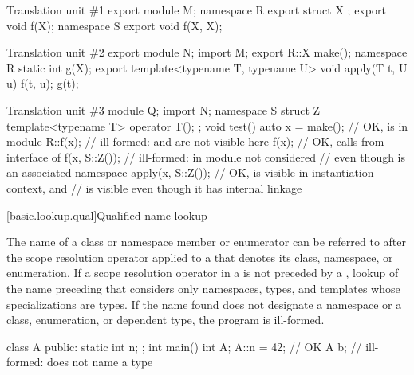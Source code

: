 \pnum
\begin{example}
\begin{codeblocktu}{Translation unit \#1}
export module M;
namespace R {
  export struct X {};
  export void f(X);
}
namespace S {
  export void f(X, X);
}
\end{codeblocktu}

\begin{codeblocktu}{Translation unit \#2}
export module N;
import M;
export R::X make();
namespace R { static int g(X); }
export template<typename T, typename U> void apply(T t, U u) {
  f(t, u);
  g(t);
}
\end{codeblocktu}

\begin{codeblocktu}{Translation unit \#3}
module Q;
import N;
namespace S {
  struct Z { template<typename T> operator T(); };
}
void test() {
  auto x = make();              // OK,  is  in module 
  R::f(x);                      // ill-formed:  and  are not visible here
  f(x);                         // OK, calls  from interface of 
  f(x, S::Z());                 // ill-formed:  in module  not considered
                                // even though  is an associated namespace
  apply(x, S::Z());             // OK,  is visible in instantiation context, and
                                //  is visible even though it has internal linkage
}
\end{codeblocktu}
\end{example}

[basic.lookup.qual]{Qualified name lookup}

\pnum
{}%
%
%
The name of a class or namespace member
or enumerator can be referred to after the
\tcode{::} scope resolution operator applied to a
 that denotes its class,
namespace, or enumeration.
If a
\tcode{::} scope resolution
operator
in a  is not preceded by a ,
lookup of the name preceding that \tcode{::} considers only namespaces, types, and
templates whose specializations are types. If the
name found does not designate a namespace or a class, enumeration, or dependent type,
the program is ill-formed. \begin{example}

\begin{codeblock}
class A {
public:
  static int n;
};
int main() {
  int A;
  A::n = 42;        // OK
  A b;              // ill-formed:  does not name a type
}
\end{codeblock}
\end{example}

